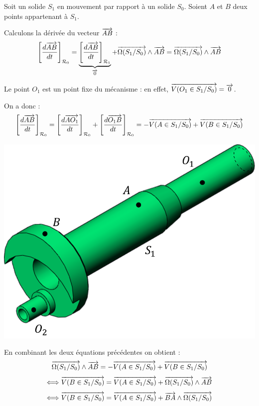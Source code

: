 \documentclass[11pt,oneside]{article}
\begin{document}
\begin{minipage}[c]{.65\linewidth}
Soit un solide $S_1$ en mouvement par rapport à un solide $S_0$. Soient $A$ et $B$ deux points appartenant à $S_1$. 

Calculons la dérivée du vecteur $\overrightarrow{AB}$ :
$$
\left[ \dfrac{d\overrightarrow{AB}}{dt}\right]_{\mathcal{R}_0} = 
\underbrace{\left[ \dfrac{d\overrightarrow{AB}}{dt}\right]_{\mathcal{R}_1}}_{\overrightarrow{0}} + \overrightarrow{\Omega(S_1/S_0)}\wedge \overrightarrow{AB}
=\overrightarrow{\Omega(S_1/S_0)}\wedge \overrightarrow{AB}
$$

Le point $O_1$ est un point fixe du mécanisme : en effet, $\overrightarrow{V(O_1\in S_1/S_0)}=\overrightarrow{0}$.

On a donc :
$$
\left[ \dfrac{d\overrightarrow{AB}}{dt}\right]_{\mathcal{R}_0} = 
\left[ \dfrac{d\overrightarrow{AO_1}}{dt}\right]_{\mathcal{R}_0} 
+\left[ \dfrac{d\overrightarrow{O_1B}}{dt}\right]_{\mathcal{R}_0}
=-\overrightarrow{V(A\in S_1/S_0)}+\overrightarrow{V(B\in S_1/S_0)}
$$
\end{minipage} \hfill
\begin{minipage}[c]{.3\linewidth}
\begin{center}
\includegraphics[width=.9\textwidth]{png/vilebrequin}
\end{center}
\end{minipage}

\vspace{.5cm}

En combinant les deux équations précédentes on obtient : 
$$
\overrightarrow{\Omega(S_1/S_0)}\wedge \overrightarrow{AB}=-\overrightarrow{V(A\in S_1/S_0)}+\overrightarrow{V(B\in S_1/S_0)}
$$
$$\Longleftrightarrow
\overrightarrow{V(B\in S_1/S_0)} = \overrightarrow{V(A\in S_1/S_0)} + \overrightarrow{\Omega(S_1/S_0)}\wedge \overrightarrow{AB}
$$
$$\Longleftrightarrow
\overrightarrow{V(B\in S_1/S_0)} = \overrightarrow{V(A\in S_1/S_0)} + \overrightarrow{BA}\wedge \overrightarrow{\Omega(S_1/S_0)}
$$
\end{document}
